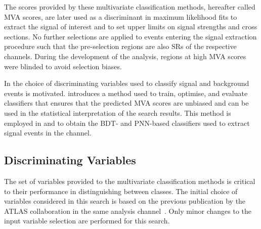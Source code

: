 The scores provided by these multivariate classification methods,
hereafter called MVA scores, are later used as a discriminant in
maximum likelihood fits to extract the signal of interest and to set
upper limits on signal strengths and cross sections. No further
selections are applied to events entering the signal extraction
procedure such that the pre-selection regions are also SRs
of the respective channels. During the development of the analysis,
regions at high MVA scores were blinded to avoid selection biases.

In  the choice of
discriminating variables used to classify signal and background events
is motivated.  introduces a method used
to train, optimise, and evaluate classifiers that ensures that the
predicted MVA scores are unbiased and can be used in the statistical
interpretation of the search results. This method is employed in
 and  to obtain the BDT- and
PNN-based classifiers used to extract signal events in the \hadhad
channel.



\subsection{Discriminating Variables}%
\label{sec:mva_discriminating variables}

The set of variables provided to the multivariate classification
methods is critical to their performance in distinguishing between
classes. The initial choice of variables considered in this search is
based on the previous publication by the ATLAS collaboration in the
same analysis channel~\cite{HIGG-2016-16-witherratum}. Only minor
changes to the input variable selection are performed for this search.

